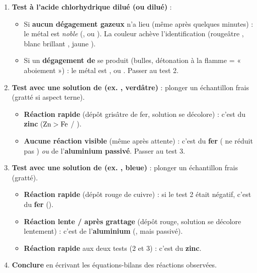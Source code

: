 \documentclass[11pt]{article}
\begin{document}
\begin{methode}
\begin{enumerate}
\item \textbf{Test à l'acide chlorhydrique dilué (ou  dilué)} :
\begin{itemize}
\item Si \textbf{aucun dégagement gazeux} n'a lieu (même après quelques minutes) : le métal est \emph{noble} (,  ou ). La couleur achève l'identification (rougeâtre , blanc brillant , jaune ).
\item Si un \textbf{dégagement de } se produit (bulles, détonation à la flamme = « aboiement ») : le métal est ,  ou . Passer au test 2.
\end{itemize}
\item \textbf{Test avec une solution de  (ex. , verdâtre)} : plonger un échantillon frais (gratté si aspect terne).
\begin{itemize}
\item \textbf{Réaction rapide} (dépôt grisâtre de fer, solution se décolore) : c'est du \textbf{zinc} ($\ce{Zn} > \ce{Fe}$ / ).
\item \textbf{Aucune réaction visible} (même après attente) : c'est du \textbf{fer} ( ne réduit pas ) \emph{ou} de l'\textbf{aluminium passivé}. Passer au test 3.
\end{itemize}
\item \textbf{Test avec une solution de  (ex. , bleue)} : plonger un échantillon frais (gratté).
\begin{itemize}
\item \textbf{Réaction rapide} (dépôt rouge de cuivre) : si le test 2 était négatif, c'est du \textbf{fer} ().
\item \textbf{Réaction lente / après grattage} (dépôt rouge, solution se décolore lentement) : c'est de l'\textbf{aluminium} (, mais passivé).
\item \textbf{Réaction rapide} aux deux tests (2 et 3) : c'est du \textbf{zinc}.
\end{itemize}
\item \textbf{Conclure} en écrivant les équations-bilans des réactions observées.
\end{enumerate}
\end{methode}
\end{document}
